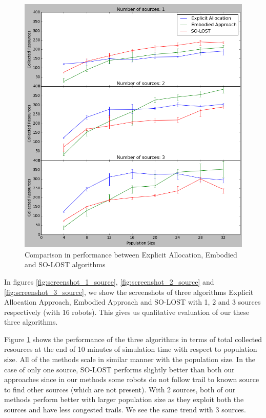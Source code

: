\documentclass[letterpaper, 10 pt, conference]{ieeeconf}  %
\begin{document}
\begin{figure}
   \includegraphics[width=.9\linewidth]{comparison.png}
   \centering
   \caption{Comparison in performance between Explicit Allocation, Embodied and SO-LOST algorithms}
   \label{fig:comparison}
\end{figure}

In figures \ref{fig:screenshot_1_source}, \ref{fig:screenshot_2_source} and \ref{fig:screenshot_3_source}, we show the screenshots of three algorithms Explicit Allocation Approach, Embodied Approach and SO-LOST with 1, 2 and 3 sources respectively (with 16 robots). This gives us qualitative evaluation of our these three algorithms. 

Figure \ref{fig:comparison} shows the performance of the three algorithms in terms of total collected resources at the end of 10 minutes of simulation time with respect to population size. All of the methods scale in similar manner with the population size. In the case of only one source, SO-LOST performs slightly better than both our approaches since in our methods some robots do not follow trail to known source to find other sources (which are not present). With 2 sources, both of our methods perform better with larger population size as they exploit both the sources and have less congested trails. We see the same trend with 3 sources.
\end{document}
